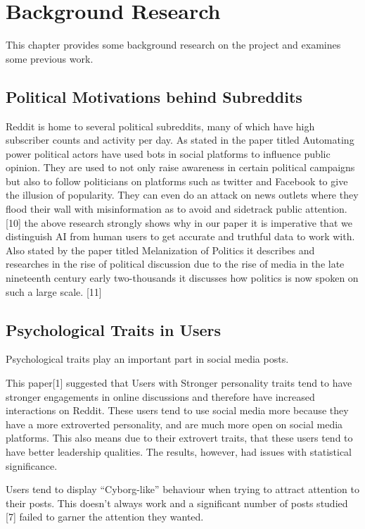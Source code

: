 \chapter{Background Research}\label{ch:Background}

This chapter provides some background research on the project and examines some previous work.

\section{Political Motivations behind Subreddits}
Reddit is home to several political subreddits, many of which have high subscriber counts and activity per day. As stated in the paper titled Automating power political actors have used bots in social platforms to influence public opinion. They are used to not only raise awareness in certain political campaigns but also to follow politicians on platforms such as twitter and Facebook to give the illusion of popularity. They can even do an attack on news outlets where they flood their wall with misinformation as to avoid and sidetrack public attention. [10] the above research strongly shows why in our paper it is imperative that we distinguish AI from human users to get accurate and truthful data to work with. Also stated by the paper titled Melanization of Politics it describes and researches in the rise of political discussion due to the rise of media in the late nineteenth century early two-thousands it discusses how politics is now spoken on such a large scale. [11]

\section{Psychological Traits in Users}
Psychological traits play an important part in social media posts.

This paper[1] suggested that Users with Stronger personality traits tend to have stronger engagements in online discussions and therefore have increased interactions on Reddit. These users tend to use social media more because they have a more extroverted personality, and are much more open on social media platforms. This also means due to their extrovert traits, that these users tend to have better leadership qualities. The results, however, had issues with statistical significance.

Users tend to display “Cyborg-like” behaviour when trying to attract attention to their posts. This doesn’t always work and a significant number of posts studied [7] failed to garner the attention they wanted. 

